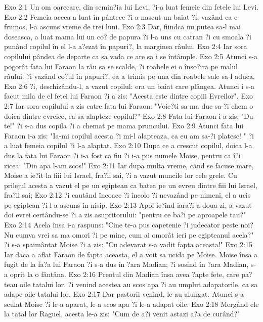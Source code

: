 Exo 2:1  Un om oarecare, din semin?ia lui Levi, ?i-a luat femeie din fetele lui Levi.
Exo 2:2  Femeia aceea a luat în pântece ?i a nascut un baiat ?i, vazând ca e frumos, l-a ascuns vreme de trei luni.
Exo 2:3  Dar, fiindca nu putea sa-l mai doseasca, a luat mama lui un co? de papura ?i l-a uns cu catran ?i cu smoala ?i punând copilul în el l-a a?ezat în papuri?, la marginea râului.
Exo 2:4  Iar sora copilului pândea de departe ca sa vada ce are sa i se întâmple.
Exo 2:5  Atunci s-a pogorât fata lui Faraon la râu sa se scalde, ?i roabele ei o înso?ira pe malul râului. ?i vazând co?ul în papuri?, ea a trimis pe una din roabele sale sa-l aduca.
Exo 2:6  ?i, deschizându-l, a vazut copilul: era un baiat care plângea. Atunci i s-a facut mila de el fetei lui Faraon ?i a zis: "Acesta este dintre copiii Evreilor".
Exo 2:7  Iar sora copilului a zis catre fata lui Faraon: "Voie?ti sa ma duc sa-?i chem o doica dintre evreice, ca sa alapteze copilul?"
Exo 2:8  Fata lui Faraon i-a zis: "Du-te!" ?i s-a dus copila ?i a chemat pe mama pruncului.
Exo 2:9  Atunci fata lui Faraon i-a zis: "Ia-mi copilul acesta ?i mi-l alapteaza, ca eu am sa-?i platesc! " ?i a luat femeia copilul ?i l-a alaptat.
Exo 2:10  Dupa ce a crescut copilul, doica l-a dus la fata lui Faraon ?i i-a fost ca fiu ?i i-a pus numele Moise, pentru ca î?i zicea: "Din apa l-am scos!"
Exo 2:11  Iar dupa multa vreme, când se facuse mare, Moise a ie?it la fiii lui Israel, fra?ii sai, ?i a vazut muncile lor cele grele. Cu prilejul acesta a vazut el pe un egiptean ca batea pe un evreu dintre fiii lui Israel, fra?ii sai;
Exo 2:12  ?i cautând încoace ?i încolo ?i nevazând pe nimeni, el a ucis pe egiptean ?i l-a ascuns în nisip.
Exo 2:13  Apoi ie?ind iara?i a doua zi, a vazut doi evrei certându-se ?i a zis asupritorului: "pentru ce ba?i pe aproapele tau?"
Exo 2:14  Acela însa i-a raspuns: "Cine te-a pus capetenie ?i judecator peste noi? Nu cumva vrei sa ma omori ?i pe mine, cum ai omorât ieri pe egipteanul acela?" ?i s-a spaimântat Moise ?i a zis: "Cu adevarat s-a vadit fapta aceasta!"
Exo 2:15  Iar daca a aflat Faraon de fapta aceasta, el a voit sa ucida pe Moise. Moise însa a fugit de la fa?a lui Faraon ?i s-a dus în ?ara Madian; ?i sosind în ?ara Madian, s-a oprit la o fântâna.
Exo 2:16  Preotul din Madian însa avea ?apte fete, care pa?teau oile tatalui lor. ?i venind acestea au scos apa ?i au umplut adapatorile, ca sa adape oile tatalui lor.
Exo 2:17  Dar pastorii venind, le-au alungat. Atunci s-a sculat Moise ?i le-a aparat, le-a scos apa ?i le-a adapat oile.
Exo 2:18  Mergând ele la tatal lor Raguel, acesta le-a zis: "Cum de a?i venit astazi a?a de curând?"
